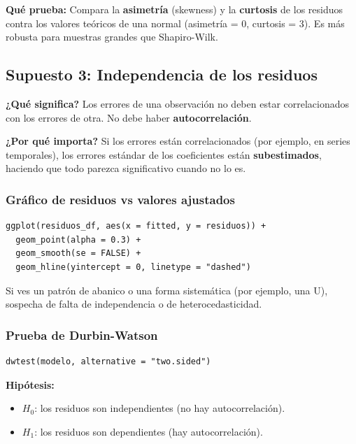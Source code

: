 \documentclass[12pt,a4paper]{article}
\begin{document}
\textbf{Qué prueba:} Compara la \textbf{asimetría} (skewness) y la \textbf{curtosis} de los residuos contra los valores teóricos de una normal (asimetría = 0, curtosis = 3). Es más robusta para muestras grandes que Shapiro-Wilk.

\subsection{Supuesto 3: Independencia de los residuos}

\textbf{¿Qué significa?} Los errores de una observación no deben estar correlacionados con los errores de otra. No debe haber \textbf{autocorrelación}.

\textbf{¿Por qué importa?} Si los errores están correlacionados (por ejemplo, en series temporales), los errores estándar de los coeficientes están \textbf{subestimados}, haciendo que todo parezca significativo cuando no lo es.

\subsubsection{Gráfico de residuos vs valores ajustados}

\begin{lstlisting}
ggplot(residuos_df, aes(x = fitted, y = residuos)) +
  geom_point(alpha = 0.3) +
  geom_smooth(se = FALSE) +
  geom_hline(yintercept = 0, linetype = "dashed")
\end{lstlisting}

Si ves un patrón de abanico o una forma sistemática (por ejemplo, una U), sospecha de falta de independencia o de heterocedasticidad.

\subsubsection{Prueba de Durbin-Watson}

\begin{lstlisting}
dwtest(modelo, alternative = "two.sided")
\end{lstlisting}

\textbf{Hipótesis:}
\begin{itemize}
    \item $H_0$: los residuos son independientes (no hay autocorrelación).
    \item $H_1$: los residuos son dependientes (hay autocorrelación).
\end{itemize}
\end{document}
